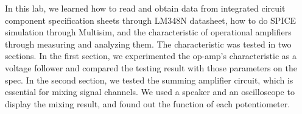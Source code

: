 In this lab, we learned how to read and obtain data from integrated circuit component specification sheets through LM348N datasheet, how to do SPICE simulation through Multisim, and the characteristic of operational amplifiers through measuring and analyzing them. \newline
\phantom{ } The characteristic was tested in two sections. In the first section, we experimented the op-amp's characteristic as a voltage follower and compared the testing result with those parameters on the spec. In the second section, we tested the summing amplifier circuit, which is essential for mixing signal channels. We used a speaker and an oscilloscope to display the mixing result, and found out the function of each potentiometer.